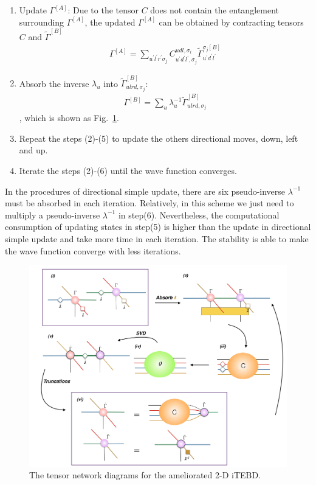 \begin{enumerate}
		\item Update $\Gamma^{[A]}$: Due to the tensor $C$ does not contain the entanglement surrounding $\Gamma^{[A]}$, the updated $\Gamma^{[A]}$ can be obtained by contracting tensors $C$ and $\widetilde{\Gamma}^{[B]}$
			\begin{align}
				\Gamma^{[A]} = \sum_{u^{\prime}l^{\prime}r^{\prime}\sigma_j}{C^{udl,\sigma_i}_{u^{\prime}d^{\prime}l^{\prime},\sigma_j} \widetilde{\Gamma}^{\sigma_j [B]}_{u^{\prime}d^{\prime}l^{\prime}}}
			\end{align}
		\item Absorb the inverse $\lambda_{u}$ into $\widetilde{\Gamma}^{[B]}_{ulrd,\sigma_j}$:
			\begin{align}
				\Gamma^{[B]} = \sum_{u}{\lambda_{u}^{-1}\widetilde{\Gamma}^{[B]}_{ulrd,\sigma_j}}
			\end{align}
			, which is shown as Fig.~\ref{fig318}.
		\item Repeat the steps (2)-(5) to update the others directional moves, down, left and up.  
		\item Iterate the steps (2)-(6) until the wave function converges.
\end{enumerate}

In the procedures of directional simple update, there are six pseudo-inverse $\lambda^{-1}$ must be absorbed in each iteration. Relatively, in this scheme we just need to multiply a pseudo-inverse $\lambda^{-1}$ in step(6). Nevertheless, the computational consumption of updating states in step(5) is higher than the update in directional simple update and take more time in each iteration. The stability is able to make the wave function converge with less iterations.

\begin{figure}[ht]
	\centering
	\includegraphics[width=1.00\textwidth]{figures/fig317.png}
	\caption[The tensor network diagrams for the 2-D iTEBD with QR decomposition]{The tensor network diagrams for the ameliorated 2-D iTEBD.}
	\label{fig318}
\end{figure}

